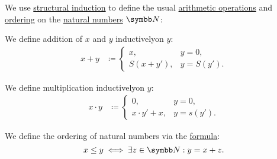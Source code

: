 \begin{definition}\label{def:natural_number_operations}
  We use \hyperref[remark:induction]{structural induction} to define the usual \hyperref[def:algebraic_theory]{arithmetic operations} and \hyperref[remark:order_infix_notation]{ordering} on the \hyperref[def:natural_numbers]{natural numbers} \( \BN \):
  \begin{DefEnum}
     We define addition of \( x \) and \( y \) inductively\IND on \( y \):
    \begin{align*}
      x + y & \coloneqq \begin{cases}
        x,         & y = 0,     \\
        S(x + y'), & y = S(y').
      \end{cases}
    \end{align*}

     We define multiplication inductively\IND on \( y \):
    \begin{align*}
      x \cdot y & \coloneqq \begin{cases}
        0,              & y = 0,     \\
        x \cdot y' + x, & y = s(y').
      \end{cases}
    \end{align*}

     We define the ordering of natural numbers via the \hyperref[def:first_order_formula]{formula}:
    \begin{equation*}
      x \leq y \iff \exists z \in \BN: y = x + z.
    \end{equation*}
  \end{DefEnum}
\end{definition}

